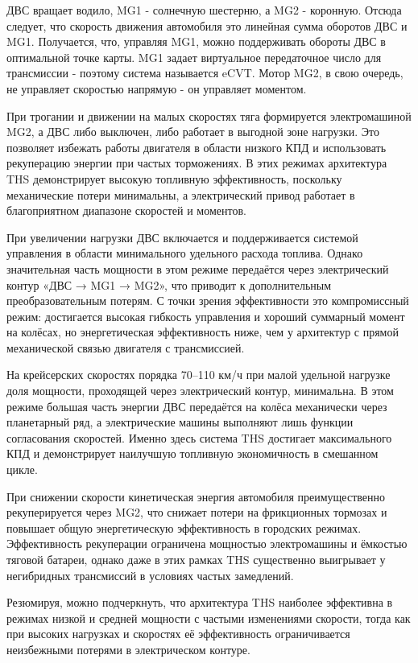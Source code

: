 ДВС вращает водило, MG1 - солнечную шестерню, а MG2 - коронную. Отсюда следует, что скорость движения автомобиля это линейная сумма оборотов ДВС и MG1. Получается, что, управляя MG1, можно поддерживать обороты ДВС в оптимальной точке карты. MG1 задает виртуальное передаточное число для трансмиссии - поэтому система называется eCVT. Мотор MG2, в свою очередь, не управляет скоростью напрямую - он управляет моментом.

При трогании и движении на малых скоростях тяга формируется электромашиной MG2, а ДВС либо выключен, либо работает в выгодной зоне нагрузки. Это позволяет избежать работы двигателя в области низкого КПД и использовать рекуперацию энергии при частых торможениях. В этих режимах архитектура THS демонстрирует высокую топливную эффективность, поскольку механические потери минимальны, а электрический привод работает в благоприятном диапазоне скоростей и моментов.

При увеличении нагрузки ДВС включается и поддерживается системой управления в области минимального удельного расхода топлива. Однако значительная часть мощности в этом режиме передаётся через электрический контур «ДВС → MG1 → MG2», что приводит к дополнительным преобразовательным потерям. С точки зрения эффективности это компромиссный режим: достигается высокая гибкость управления и хороший суммарный момент на колёсах, но энергетическая эффективность ниже, чем у архитектур с прямой механической связью двигателя с трансмиссией.

На крейсерских скоростях порядка 70–110 км/ч при малой удельной нагрузке доля мощности, проходящей через электрический контур, минимальна. В этом режиме большая часть энергии ДВС передаётся на колёса механически через планетарный ряд, а электрические машины выполняют лишь функции согласования скоростей. Именно здесь система THS достигает максимального КПД и демонстрирует наилучшую топливную экономичность в смешанном цикле.

При снижении скорости кинетическая энергия автомобиля преимущественно рекуперируется через MG2, что снижает потери на фрикционных тормозах и повышает общую энергетическую эффективность в городских режимах. Эффективность рекуперации ограничена мощностью электромашины и ёмкостью тяговой батареи, однако даже в этих рамках THS существенно выигрывает у негибридных трансмиссий в условиях частых замедлений.

Резюмируя, можно подчеркнуть, что архитектура THS наиболее эффективна в режимах низкой и средней мощности с частыми изменениями скорости, тогда как при высоких нагрузках и скоростях её эффективность ограничивается неизбежными потерями в электрическом контуре.

